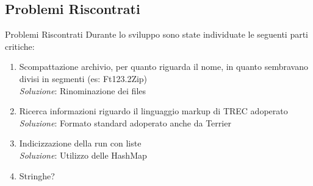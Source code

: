 \subsection{Problemi Riscontrati}
\begin{frame}{Problemi Riscontrati}
	Durante lo sviluppo sono state individuate le seguenti parti critiche:
	\begin{enumerate}
		\item Scompattazione archivio, per quanto riguarda il nome, in quanto sembravano divisi in segmenti (es: Ft123.2Zip) 
				\\ \textit{Soluzione}: Rinominazione dei files
		\item Ricerca informazioni riguardo il linguaggio markup di TREC adoperato
				\\ \textit{Soluzione}: Formato standard adoperato anche da Terrier
		\item Indicizzazione della run con liste
				\\ \textit{Soluzione}: Utilizzo delle HashMap
		\item Stringhe?
	\end{enumerate}
\end{frame}


